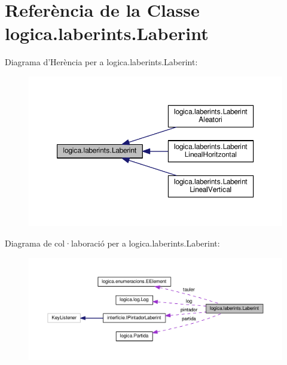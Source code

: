 \hypertarget{classlogica_1_1laberints_1_1_laberint}{\section{Referència de la Classe logica.\+laberints.\+Laberint}
\label{classlogica_1_1laberints_1_1_laberint}
}


Diagrama d'Herència per a logica.\+laberints.\+Laberint\+:\nopagebreak
\begin{figure}[H]
\begin{center}
\leavevmode
\includegraphics[width=350pt]{classlogica_1_1laberints_1_1_laberint__inherit__graph}
\end{center}
\end{figure}


Diagrama de col·laboració per a logica.\+laberints.\+Laberint\+:\nopagebreak
\begin{figure}[H]
\begin{center}
\leavevmode
\includegraphics[width=350pt]{classlogica_1_1laberints_1_1_laberint__coll__graph}
\end{center}
\end{figure}
